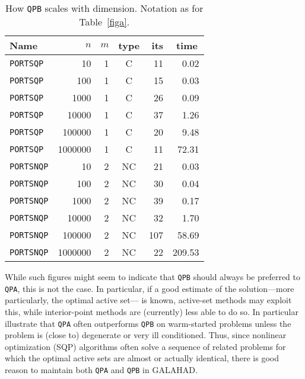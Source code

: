 \documentclass[twoside]{article}
\newcommand{\gal}{{\sf GALAHAD}}
\begin{document}
\begin{table}[htb]
\begin{center}
\begin{tabular}[c]{|lrrc|rr|}
\hline
Name      & $n$ & $m$ & type & its & time\, \\
\hline
{\tt PORTSQP}  & 10 & 1  & C & 11    & {0.02} \\
{\tt PORTSQP}  & 100 & 1  & C &  15   & {0.03} \\
{\tt PORTSQP}  & 1000 & 1  & C &  26   & {0.09} \\
{\tt PORTSQP}  & 10000 & 1  & C &  37   & {1.26} \\
{\tt PORTSQP}  & 100000 & 1  & C &  20   & {9.48} \\
{\tt PORTSQP}  & 1000000 & 1  & C &  11   & {72.31} \\
\hline
{\tt PORTSNQP}  & 10 & 2  & NC & 21    & {0.03} \\
{\tt PORTSNQP}  & 100 & 2  & NC &  30   & {0.04} \\
{\tt PORTSNQP}  & 1000 & 2  & NC &  39   & {0.17} \\
{\tt PORTSNQP}  & 10000 & 2  & NC &  32   & {1.70} \\
{\tt PORTSNQP}  & 100000 & 2  & NC &  107   & { 58.69} \\
{\tt PORTSNQP}  & 1000000 & 2  & NC &  22   & {209.53} \\
\hline
\end{tabular}
\end{center}
\caption{\label{figb} How {\tt QPB} scales with dimension.
Notation as for Table~\ref{figa}.}
\end{table}

While such figures might seem to indicate that {\tt QPB} should always
be preferred to {\tt QPA}, this is not the case. In particular, if a
good estimate of the solution---more particularly, the optimal active set---
is known, active-set methods may exploit this, while interior-point methods
are (currently) less able to do so. In particular
 illustrate that {\tt QPA} often outperforms {\tt QPB}
on warm-started problems unless the problem is (close to) degenerate or
very ill conditioned. Thus, since nonlinear optimization (SQP) algorithms
often solve a sequence of related problems for which the optimal active sets
are almost or actually identical, there is good reason to maintain both
{\tt QPA} and {\tt QPB} in \gal.
\end{document}
